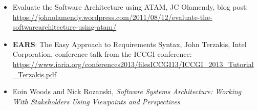 \begin{itemize}
\item
Evaluate the Software Architecture using ATAM, JC Olamendy, blog post: \url{https://johnolamendy.wordpress.com/2011/08/12/evaluate-the-softwarearchitecture-using-atam/}

\item
\textbf{EARS}: The Easy Approach to Requirements Syntax, John Terzakis, Intel Corporation, conference talk from the ICCGI conference: \url{https://www.iaria.org/conferences2013/filesICCGI13/ICCGI_2013_Tutorial_Terzakis.pdf}

\item
Eoin Woods and Nick Rozanski, \textit{Software Systems Architecture: Working With Stakeholders Using Viewpoints and Perspectives}

\end{itemize}